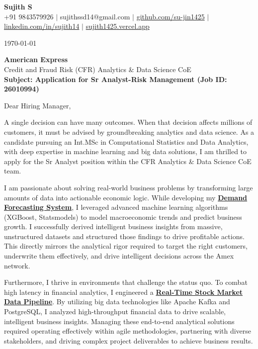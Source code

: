 \documentclass[a4paper,11pt]{article}
\newcommand{\ulink}[2]{\href{#1}{#2}}
\begin{document}
\pagestyle{empty}

\begin{center}
{\color[HTML]{000000}\fontsize{30}{35}\selectfont\bfseries Sujith S} \\[5pt]
{\fontsize{10.5}{12.5}\selectfont\textcolor[HTML]{3A3A3A}{+91 9843579926 $|$ sujithssd14@gmail.com $|$ \ulink{https://github.com/su-jin1425}{github.com/su-jin1425} $|$ \ulink{https://linkedin.com/in/sujith14}{linkedin.com/in/sujith14} $|$ \ulink{https://sujith1425.vercel.app}{sujith1425.vercel.app}}}
\end{center}

\vspace{10pt}

\today

\textbf{American Express} \\
Credit and Fraud Risk (CFR) Analytics \& Data Science CoE \\

\textbf{Subject: Application for Sr Analyst-Risk Management (Job ID: 26010994)}

Dear Hiring Manager,

A single decision can have many outcomes. When that decision affects millions of customers, it must be advised by groundbreaking analytics and data science. As a candidate pursuing an Int.MSc in Computational Statistics and Data Analytics, with deep expertise in machine learning and big data solutions, I am thrilled to apply for the Sr Analyst position within the CFR Analytics \& Data Science CoE team.

I am passionate about solving real-world business problems by transforming large amounts of data into actionable economic logic. While developing my \ulink{https://github.com/su-jin1425/Demand-Forecasting-System}{\textbf{Demand Forecasting System}}, I leveraged advanced machine learning algorithms (XGBoost, Statsmodels) to model macroeconomic trends and predict business growth. I successfully derived intelligent business insights from massive, unstructured datasets and structured those findings to drive profitable actions. This directly mirrors the analytical rigor required to target the right customers, underwrite them effectively, and drive intelligent decisions across the Amex network.

Furthermore, I thrive in environments that challenge the status quo. To combat high latency in financial analytics, I engineered a \ulink{https://github.com/su-jin1425/Real-Time-Stock-Market-Data-Pipeline}{\textbf{Real-Time Stock Market Data Pipeline}}. By utilizing big data technologies like Apache Kafka and PostgreSQL, I analyzed high-throughput financial data to drive scalable, intelligent business insights. Managing these end-to-end analytical solutions required operating effectively within agile methodologies, partnering with diverse stakeholders, and driving complex project deliverables to achieve business results.
\end{document}
